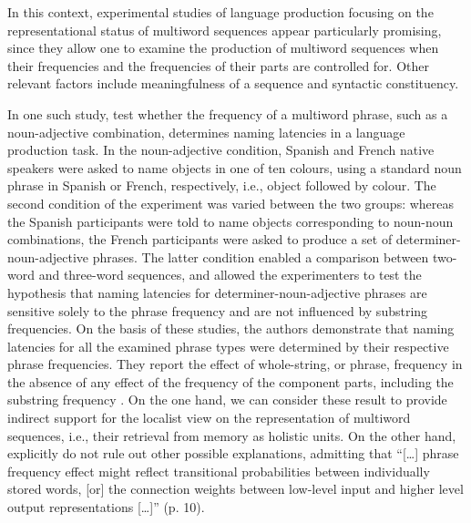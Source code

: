 In this context, experimental studies of language production focusing on the representational status of multiword sequences appear particularly promising, since they allow one to examine the production of multiword sequences when their frequencies and the frequencies of their parts are controlled for. Other relevant factors include meaningfulness of a sequence and syntactic constituency.

In one such study, \citet{janssen-barber} test whether the frequency of a multiword phrase, such as a noun-adjective combination, determines naming latencies in a language production task. In the noun-adjective condition, Spanish and French native speakers were asked to name objects in one of ten colours, using a standard noun phrase in Spanish or French, respectively, i.e., object followed by colour. The second condition of the experiment was varied between the two groups: whereas the Spanish participants were told to name objects corresponding to noun-noun combinations, the French participants were asked to produce a set of determiner-noun-adjective phrases. The latter condition enabled a comparison between two-word and three-word sequences, and allowed the experimenters to test the hypothesis that naming latencies for determiner-noun-adjective phrases are sensitive solely to the phrase frequency and are not influenced by substring frequencies. On the basis of these studies, the authors demonstrate that naming latencies for all the examined phrase types were determined by their respective phrase frequencies. They report the effect of whole-string, or phrase, frequency in the absence of any effect of the frequency of the component parts, including the substring frequency \citep[see][for a similar result observed in language comprehension]{tremblay-etal11}. On the one hand, we can consider these result to provide indirect support for the localist view on the representation of multiword sequences, i.e., their retrieval from memory as holistic units. On the other hand, \citeauthor{janssen-barber} explicitly do not rule out other possible explanations, admitting that ``[\dots] phrase frequency effect might reflect transitional probabilities between individually stored words, [or] the connection weights between low-level input and higher level output representations [\dots]'' (p. 10).

